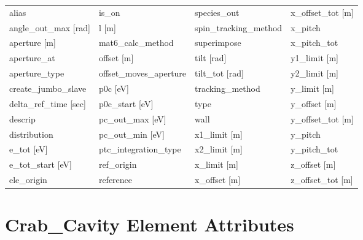  \begin{tabular}{llll} \toprule
alias                            & is_on                            & species_out                      & x_offset_tot [m]                 \\
angle_out_max [rad]              & l [m]                            & spin_tracking_method             & x_pitch                          \\
aperture [m]                     & mat6_calc_method                 & superimpose                      & x_pitch_tot                      \\
aperture_at                      & offset [m]                       & tilt [rad]                       & y1_limit [m]                     \\
aperture_type                    & offset_moves_aperture            & tilt_tot [rad]                   & y2_limit [m]                     \\
create_jumbo_slave               & p0c [eV]                         & tracking_method                  & y_limit [m]                      \\
delta_ref_time [sec]             & p0c_start [eV]                   & type                             & y_offset [m]                     \\
descrip                          & pc_out_max [eV]                  & wall                             & y_offset_tot [m]                 \\
distribution                     & pc_out_min [eV]                  & x1_limit [m]                     & y_pitch                          \\
e_tot [eV]                       & ptc_integration_type             & x2_limit [m]                     & y_pitch_tot                      \\
e_tot_start [eV]                 & ref_origin                       & x_limit [m]                      & z_offset [m]                     \\
ele_origin                       & reference                        & x_offset [m]                     & z_offset_tot [m]                 \\
 \bottomrule
 \end{tabular}
 \vfill
 
 \section{Crab_Cavity Element Attributes}
 \label{s:list.crab.cavity}
 
